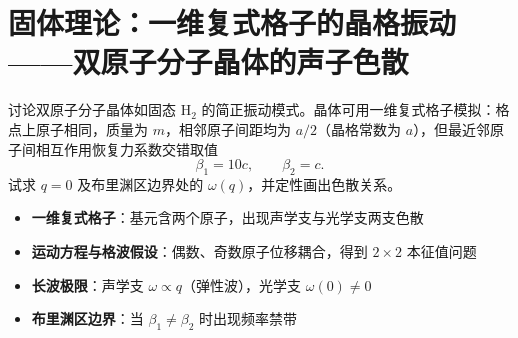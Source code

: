 \section{固体理论：一维复式格子的晶格振动——双原子分子晶体的声子色散}
\label{sec:diatomic-lattice-vibration}

\begin{modelbox}[题目：双原子分子晶体的简正振动模式]
讨论双原子分子晶体如固态 $\mathrm{H}_2$ 的简正振动模式。晶体可用一维复式格子模拟：格点上原子相同，质量为 $m$，相邻原子间距均为 $a/2$（晶格常数为 $a$），但最近邻原子间相互作用恢复力系数交错取值
\[
\beta_1 = 10c, \qquad \beta_2 = c.
\]
试求 $q=0$ 及布里渊区边界处的 $\omega(q)$，并定性画出色散关系。
\end{modelbox}

\begin{tipbox}[考点快速分析]
\begin{itemize}
    \item \textbf{一维复式格子}：基元含两个原子，出现声学支与光学支两支色散
    \item \textbf{运动方程与格波假设}：偶数、奇数原子位移耦合，得到 $2\times2$ 本征值问题
    \item \textbf{长波极限}：声学支 $\omega\propto q$（弹性波），光学支 $\omega(0)\neq 0$
    \item \textbf{布里渊区边界}：当 $\beta_1\neq\beta_2$ 时出现频率禁带
\end{itemize}
\end{tipbox}


